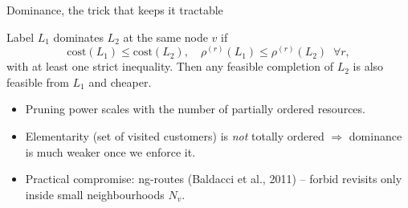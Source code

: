 \documentclass[10pt,aspectratio=169]{beamer}
\begin{document}
\begin{frame}{Dominance, the trick that keeps it tractable}
  \begin{tcolorbox}[colback=accent2!8,colframe=accent2!60,sharp corners,boxrule=0.4pt,
                    left=4pt,right=4pt,top=2pt,bottom=2pt]
  Label $L_1$ \alert{dominates} $L_2$ at the same node $v$ if
  \[
    \text{cost}(L_1)\le\text{cost}(L_2),\quad
    \rho^{(r)}(L_1)\le\rho^{(r)}(L_2)\;\;\forall r,
  \]
  with at least one strict inequality. Then any feasible completion of $L_2$
  is also feasible from $L_1$ and cheaper.
  \end{tcolorbox}

  \begin{itemize}\small
    \item Pruning power scales with the number of \alert{partially ordered}
          resources.
    \item Elementarity (set of visited customers) is \emph{not} totally
          ordered $\Rightarrow$ dominance is much weaker once we enforce it.
    \item Practical compromise: \alert{ng-routes} (Baldacci et al., 2011) --
          forbid revisits only inside small neighbourhoods $N_v$.
  \end{itemize}
\end{frame}
\end{document}
